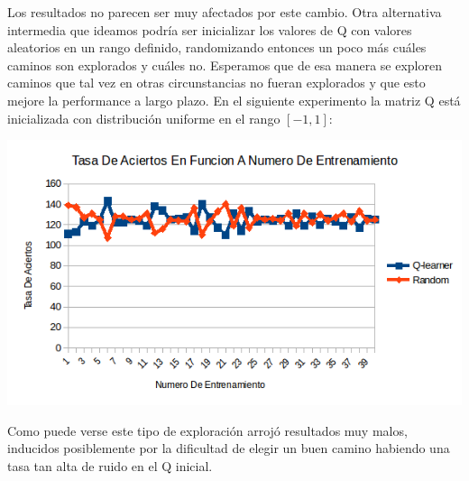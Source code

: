 Los resultados no parecen ser muy afectados por este cambio. Otra alternativa intermedia que ideamos podría ser inicializar los valores de Q con valores aleatorios en un rango definido, randomizando entonces un poco más cuáles caminos son explorados y cuáles no. Esperamos que de esa manera se exploren caminos que tal vez en otras circunstancias no fueran explorados y que esto mejore la performance a largo plazo. En el siguiente experimento la matriz Q está inicializada con distribución uniforme en el rango $[-1,1]$:

\includegraphics[scale=0.5]{testing/variarq2.png}

Como puede verse este tipo de exploración arrojó resultados muy malos, inducidos posiblemente por la dificultad de elegir un buen camino habiendo una tasa tan alta de ruido en el Q inicial.
